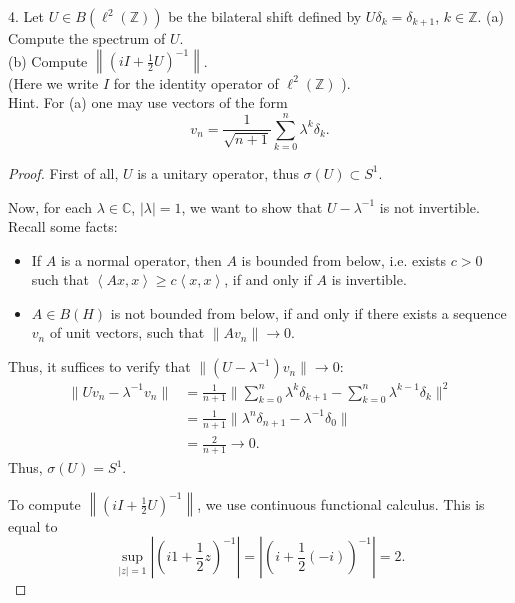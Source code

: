 \begin{problem}
	4. Let $U \in B\left(\ell^2(\mathbb{Z})\right)$ be the bilateral shift defined by $U \delta_k=\delta_{k+1}$, $k \in \mathbb{Z}$.
(a) Compute the spectrum of $U$.\\
(b) Compute $\left\|\left(i I+\frac{1}{2} U\right)^{-1}\right\|$.\\
(Here we write $I$ for the identity operator of $\ell^2(\mathbb{Z})$ ).\\
Hint. For (a) one may use vectors of the form
\[
v_n = \frac{1}{\sqrt{n+1}} \sum_{k=0}^n \lambda^k \delta_k .
\]
\end{problem}
\begin{proof}
	First of all, $U$ is a unitary operator, thus $\sigma(U) \subset S^1$.

	Now, for each $\lambda \in \mathbb{C}$, $|\lambda| = 1$, we want to show that $U - \lambda^{-1}$ is not invertible. Recall some facts:
	\begin{itemize}
		\item If $A$ is a normal operator, then $A$ is bounded from below, i.e. exists $c > 0$ such that $\left\langle A x, x \right\rangle \ge c \left\langle x, x \right\rangle $, if and only if $A$ is invertible.
		\item $A \in B(H)$ is not bounded from below, if and only if there exists a sequence $v_n$ of unit vectors, such that $\|A v_n\| \to 0$.
	\end{itemize}
	Thus, it suffices to verify that $\|\left( U  - \lambda^{-1} \right) v_n\| \to 0$:
	\begin{align*}
		\|U v_n - \lambda^{-1} v_n\|
		&= \frac{1}{n + 1} \|\sum_{k=0}^{n} \lambda^k \delta_{k + 1} - \sum_{k=0}^{n} \lambda^{k - 1} \delta_k \|^2 \\
		&= \frac{1}{n + 1} \|\lambda^n \delta_{n + 1} - \lambda^{-1} \delta_0\| \\
		&= \frac{2}{n + 1} \to 0
	.\end{align*}
	Thus, $\sigma(U) = S^1$.

	To compute $\left\|\left(i I+\frac{1}{2} U\right)^{-1}\right\|$, we use continuous functional calculus. This is equal to
	\[
		\sup _{|z| = 1} \left| \left( i 1 + \frac{1}{2} z \right) ^{-1} \right| = \left| \left( i + \frac{1}{2}(- i) \right)^{-1}  \right| = 2
	.\] 
\end{proof}




